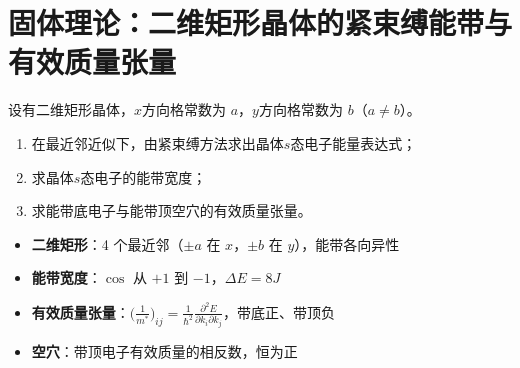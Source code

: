 \section{固体理论：二维矩形晶体的紧束缚能带与有效质量张量}
\label{sec:2d-rectangular-tight-binding}

\begin{modelbox}
设有二维矩形晶体，$x$方向格常数为 $a$，$y$方向格常数为 $b$（$a\neq b$）。
\begin{enumerate}
    \item 在最近邻近似下，由紧束缚方法求出晶体$s$态电子能量表达式；
    \item 求晶体$s$态电子的能带宽度；
    \item 求能带底电子与能带顶空穴的有效质量张量。
\end{enumerate}
\end{modelbox}

\begin{tipbox}[考点快速分析]
\begin{itemize}
    \item \textbf{二维矩形}：4 个最近邻（$\pm a$ 在 $x$，$\pm b$ 在 $y$），能带各向异性
    \item \textbf{能带宽度}：$\cos$ 从 $+1$ 到 $-1$，$\Delta E=8J$
    \item \textbf{有效质量张量}：$\bigl(\frac{1}{m^*}\bigr)_{ij}=\frac{1}{\hbar^2}\frac{\partial^2E}{\partial k_i\partial k_j}$，带底正、带顶负
    \item \textbf{空穴}：带顶电子有效质量的相反数，恒为正
\end{itemize}
\end{tipbox}

